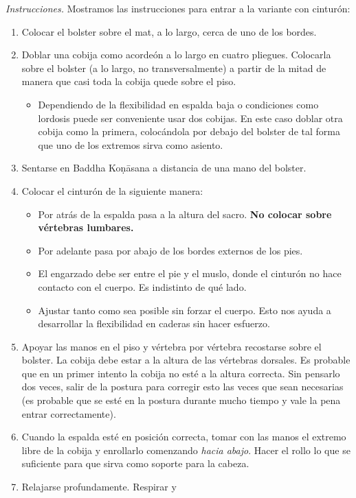 \emph{Instrucciones.} Mostramos las
instrucciones para entrar a la variante con
cinturón:
\begin{enumerate}
\item Colocar el bolster sobre el mat, a lo
largo, cerca de uno de los bordes.
\item Doblar una cobija como acordeón a lo
largo en cuatro pliegues. Colocarla sobre el
bolster (a lo largo, no transversalmente) a
partir de la mitad de manera que casi toda la
cobija quede sobre el piso.
\begin{itemize}
\item Dependiendo de la flexibilidad en
espalda baja o condiciones como lordosis
puede ser conveniente usar dos cobijas. En
este caso doblar otra cobija como la primera,
colocándola por debajo del bolster de tal
forma que uno de los extremos sirva como
asiento.
\end{itemize}
\item Sentarse en Baddha Koṇāsana a distancia
de una mano del bolster.
\item Colocar el cinturón de la siguiente
manera:
\begin{itemize}
\item Por atrás de la espalda pasa a la
altura del sacro. \textbf{No colocar sobre
vértebras lumbares.}
\item Por adelante pasa por abajo de los
bordes externos de los pies.
\item El engarzado debe ser entre el pie y el
muslo, donde el cinturón no hace contacto con
el cuerpo. Es indistinto de qué lado.
\item Ajustar tanto como sea posible sin
forzar el cuerpo. Esto nos ayuda a
desarrollar la flexibilidad en caderas sin
hacer esfuerzo.
\end{itemize}
\item Apoyar las manos en el piso y vértebra
por vértebra recostarse sobre el bolster. La
cobija debe estar a la altura de las
vértebras dorsales. Es probable que en un
primer intento la cobija no esté a la altura
correcta. Sin pensarlo dos veces, salir de la
postura para corregir esto las veces que sean
necesarias (es probable que se esté en la
postura durante mucho tiempo y vale la pena
entrar correctamente).
\item Cuando la espalda esté en posición
correcta, tomar con las manos el extremo
libre de la cobija y enrollarlo comenzando
\emph{hacia abajo}. Hacer el rollo lo que se
suficiente para que sirva como soporte para
la cabeza.
\item Relajarse profundamente. Respirar y

\end{enumerate}
